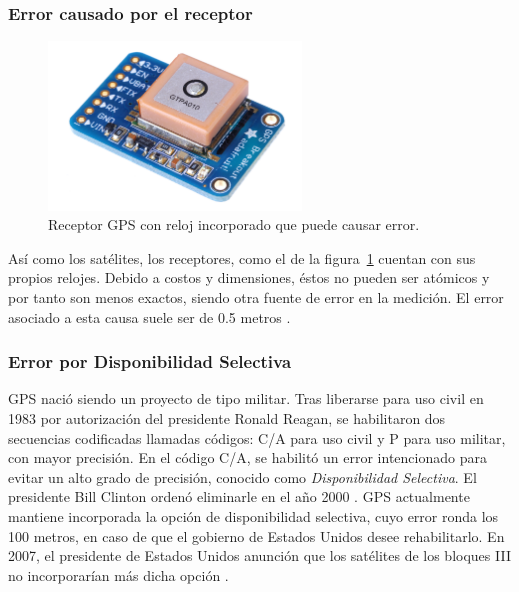 \subsubsection{Error causado por el receptor}

\begin{figure}[H]
\centering
\includegraphics[width=0.6\textwidth]{Figures/disp}
\caption[Receptor GPS con reloj incorporado que puede causar error.]{Receptor GPS con reloj incorporado que puede causar error\footnotemark.}
\label{fig:ErrRec}
\end{figure}


Así como los satélites, los receptores, como el de la figura~\ref{fig:ErrRec} cuentan con sus propios relojes. Debido a costos y dimensiones, éstos no pueden ser atómicos y por tanto son menos exactos, siendo otra fuente de error en la medición. El error asociado a esta causa suele ser de 0.5 metros \citep{fallas2002sistema}.

\subsubsection{Error por Disponibilidad Selectiva}

GPS nació siendo un proyecto de tipo militar. Tras liberarse para uso civil en 1983 por autorización del presidente Ronald Reagan, se habilitaron dos secuencias codificadas llamadas códigos: C/A para uso civil y P para uso militar, con mayor precisión. En el código C/A, se habilitó un error intencionado para evitar un alto grado de precisión, conocido como \textit{Disponibilidad Selectiva}. El presidente Bill Clinton ordenó eliminarle en el año 2000 \citep{termal2014prototipo}. GPS actualmente mantiene incorporada la opción de disponibilidad selectiva, cuyo error ronda los 100 metros, en caso de que el gobierno de Estados Unidos desee rehabilitarlo. En 2007, el presidente de Estados Unidos anunción que los satélites de los bloques III no incorporarían más dicha opción \citep{chafer2017diseno}.

